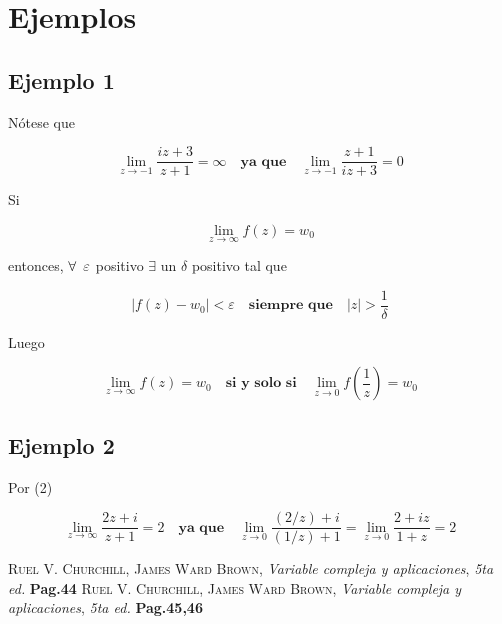 \documentclass[12p]{article}
\begin{document}
\vspace{1cm}
\section{Ejemplos}
\subsection{Ejemplo 1}
\cite{2} Nótese que

\[\lim_{z\rightarrow -1} \frac{iz + 3}{z + 1}= \infty \quad \textbf{ya que} \quad \lim_{z\rightarrow -1}\frac{z + 1}{iz + 3}=0
\]

Si

\[
\lim_{z\rightarrow \infty}f(z)=w_0
\]

entonces, $\forall \enskip \varepsilon$ positivo $\exists$ un $\delta$ positivo tal que

\begin{equation}
|f(z) - w_0| < \varepsilon \quad \textbf{siempre que} \quad |z|>\frac{1}{\delta}
\end{equation}

Luego

\begin{equation}
\lim_{z\rightarrow \infty}f(z)=w_0 \quad \textbf{si y solo si} \quad \lim_{z\rightarrow 0}f(\frac{1}{z})=w_0
\end{equation}
\vspace{.5cm}
\subsection{Ejemplo 2}
Por (2)
 
 \[\lim_{z\rightarrow \infty} \frac{2z + i}{z + 1}= 2 \quad \textbf{ya que} \quad \lim_{z\rightarrow 0}\frac{(2/z) + i}{(1/z) + 1}= \lim_{z\rightarrow 0}\frac{2 + iz}{1 + z} = 2
\]


\vspace{8 cm}



\begin{thebibliography}{x}
 \textsc{Ruel V. Churchill}, \textsc{James Ward Brown}, \textit{Variable compleja y aplicaciones}, \textit{5ta ed.} \textbf{Pag.44}
 \textsc{Ruel V. Churchill}, \textsc{James Ward Brown}, \textit{Variable compleja y aplicaciones}, \textit{5ta ed.} \textbf{Pag.45,46}
\end{thebibliography}
\end{document}
